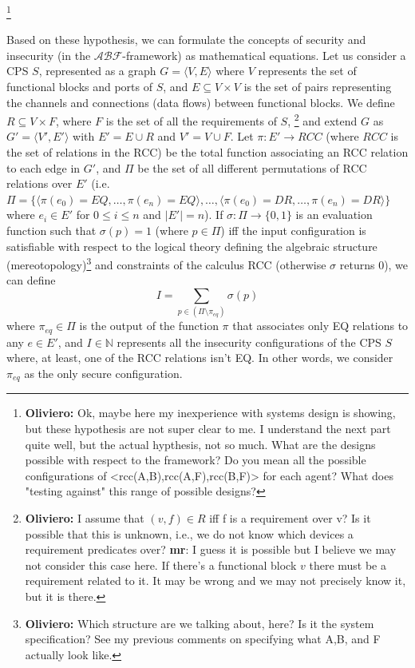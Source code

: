 \documentclass[conference]{IEEEtran}
\newcommand{\fixnote}[2]{\textbf{\color{red}{FIX}}\footnote{{\bf #1:} #2}}
\newcommand{\assertionRegion}{\mathcal{A}}
\newcommand{\beliefRegion}{\mathcal{B}}
\newcommand{\factRegion}{\mathcal{F}}
\newcommand{\abftheory}{\assertionRegion\beliefRegion\factRegion}
\begin{document}
\fixnote{Oliviero}{Ok, maybe here my inexperience with systems design is showing, but these hypothesis are not super clear to me. I understand the next part quite well, but the actual hypthesis, not so much. What are the designs possible with respect to the framework? Do you mean all the possible configurations of <rcc(A,B),rcc(A,F),rcc(B,F)> for each agent? What does "testing against" this range of possible designs?}

Based on these hypothesis, we can formulate the concepts of security and
insecurity (in the $\abftheory$-framework) as mathematical equations.  Let us
consider a CPS $S$, represented as a graph $G=\langle V,E\rangle$ where $V$
represents the set of functional blocks and ports of $S$, and $E\subseteq
V\times V$ is the set of pairs representing the channels and connections (data
flows) between functional blocks. We define $R\subseteq V\times F$, where $F$
is the set of all the requirements of $S$,
\fixnote{Oliviero}{I assume that $(v,f)\in R$ iff f is a requirement over v? Is it possible that this is unknown, i.e., we do not know which devices a requirement predicates over? {\bf mr}: I guess it is possible but I believe we may not consider this case here. If there's a functional block $v$ there must be a requirement related to it. It may be wrong and we may not precisely know it, but it is there.}
and extend $G$ as $G'=\langle V',E'\rangle$ with $E'= E\cup R$ and $V'=V\cup F$. Let $\pi:
E'\rightarrow RCC$ (where $RCC$ is the set of relations in the RCC) be the
total function associating an RCC relation to each edge in $G'$, and $\Pi$ be
the set of all different permutations of RCC relations over $E'$ (i.e.
$\Pi=\{\langle\pi(e_0)=EQ,\ldots,\pi(e_n)=EQ\rangle,\ldots,\langle
\pi(e_0)=DR,\ldots,\pi(e_n)=DR\rangle\}$ where $e_i\in E'$ for $0\leq i \leq n$ and $|E'|=n$). If $\sigma:\Pi\rightarrow\{0,1\}$ is
an evaluation function such that $\sigma(p)=1$ (where $p\in\Pi$) iff the input
configuration is satisfiable with respect to the logical theory defining the
algebraic structure (mereotopology)\fixnote{Oliviero}{Which structure are we talking about, here? Is it the system specification? See my previous comments on specifying what A,B, and F actually look like.} and constraints of the calculus RCC
(otherwise $\sigma$ returns $0$), we can define
\begin{displaymath}
	I=\sum_{p\in(\Pi\setminus\pi_{eq})} \sigma(p)
\end{displaymath}
where $\pi_{eq}\in\Pi$ is the output of the function $\pi$ that associates only EQ relations
to any $e\in E'$, and $I\in\mathbb{N}$ represents all the insecurity configurations
of the CPS $S$ where, at least, one of the RCC relations isn't EQ.
In other words, we consider $\pi_{eq}$ as the only secure configuration.
\end{document}
